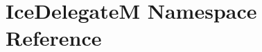 \hypertarget{namespace_ice_delegate_m}{
\section{IceDelegateM Namespace Reference}
\label{namespace_ice_delegate_m}
}
